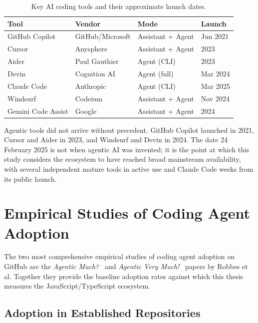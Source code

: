 \begin{table}[h]
\centering
\caption{Key AI coding tools and their approximate launch dates.}
\label{tab:tools}
\begin{tabular}{llll}
\hline
\textbf{Tool} & \textbf{Vendor} & \textbf{Mode} & \textbf{Launch} \\
\hline
GitHub Copilot       & GitHub/Microsoft & Assistant + Agent & Jun 2021 \\
Cursor               & Anysphere        & Assistant + Agent & 2023 \\
Aider                & Paul Gauthier    & Agent (CLI)       & 2023 \\
Devin                & Cognition AI     & Agent (full)      & Mar 2024 \\
Claude Code          & Anthropic        & Agent (CLI)       & Mar 2025 \\
Windsurf             & Codeium          & Assistant + Agent & Nov 2024 \\
Gemini Code Assist   & Google           & Assistant + Agent & 2024 \\
\hline
\end{tabular}
\end{table}

Agentic tools did not arrive without precedent.
GitHub Copilot launched in 2021, Cursor and Aider in 2023, and Windsurf and Devin
in 2024. The date 24 February 2025 is not when agentic AI was invented; it is the
point at which this study considers the ecosystem to have reached broad mainstream
availability, with several independent mature tools in active use and Claude Code
weeks from its public launch.

\section{Empirical Studies of Coding Agent Adoption}
\label{sec:lr:adoption}

The two most comprehensive empirical studies of coding agent adoption on GitHub
are the \emph{Agentic Much?}~\cite{robbesAgenticMuch2026} and \emph{Agentic
Very Much!}~\cite{robbesAgenticVery2026} papers by Robbes et al. Together they
provide the baseline adoption rates against which this thesis measures the
JavaScript/TypeScript ecosystem.

\subsection{Adoption in Established Repositories}

